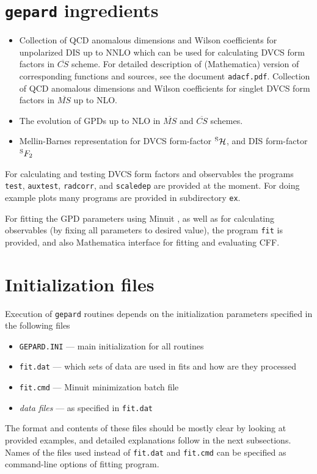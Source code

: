 \documentclass[12pt]{article}
\begin{document}
\section{\texttt{gepard} ingredients}

\begin{itemize}
\item Collection of QCD anomalous dimensions and Wilson coefficients for
unpolarized DIS up to NNLO which can be used for calculating DVCS form factors
in $\overline{CS}$ scheme. For detailed description of (Mathematica) version of
corresponding functions and sources, see the document \texttt{adacf.pdf}.
Collection of QCD anomalous dimensions and Wilson coefficients for singlet DVCS form factors
in $\overline{MS}$ up to NLO.

\item
The evolution of GPDs up to NLO in $\overline{MS}$ and  $\overline{CS}$ schemes.

\item 
Mellin-Barnes representation for DVCS form-factor ${ }^{\rm S}\mathcal{H}$, and
DIS form-factor ${}^{\rm S}F_2$
\end{itemize}

For calculating and testing DVCS form factors and observables the programs \texttt{test},
\texttt{auxtest}, \texttt{radcorr}, and \texttt{scaledep} are provided at the
moment. For doing example plots many programs are provided in subdirectory \texttt{ex}.

For fitting the GPD parameters using Minuit \cite{James:1975dr}, 
as well as for calculating observables (by
fixing all parameters to desired value), the program \texttt{fit} is provided, and
also Mathematica interface for fitting and evaluating CFF.

\section{Initialization files}
\label{sec:init}

Execution of \texttt{gepard} routines depends on the initialization parameters specified in
the following files
\begin{itemize}
\item  \texttt{GEPARD.INI} --- main initialization for all routines
\item  \texttt{fit.dat} --- which sets of data are used in fits and how are they processed
\item \texttt{fit.cmd} --- Minuit minimization batch file
\item \emph{data files} --- as specified in \texttt{fit.dat}
\end{itemize}
The format and contents of these files should be mostly clear by looking at provided
examples, and detailed explanations follow in the next subsections. Names of the
files used instead of \texttt{fit.dat} and \texttt{fit.cmd} can be specified
as command-line options of fitting program.
\end{document}
